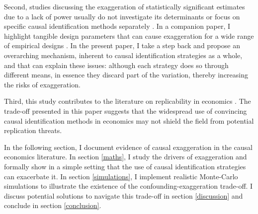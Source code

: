 			Second, studies discussing the exaggeration of statistically significant estimates due to a lack of power usually do not investigate its determinants or focus on specific causal identification methods separately \citep{ioannidis_power_2017, schellEvaluatingMethodsEstimate2018, ferraro_featureis_2020, black_simulated_2022, stommes_reliability_2021, arel-bundockQuantitativePoliticalScience2022}.  In a companion paper, I highlight tangible design parameters that can cause exaggeration for a wide range of empirical designs \citep{bagilet_accurate_2023}. In the present paper, I take a step back and propose an overarching mechanism, inherent to causal identification strategies as a whole, and that can explain these issues: although each strategy does so through different means, in essence they discard part of the variation, thereby increasing the risks of exaggeration. %
			
			Third, this study contributes to the literature on replicability in economics \citep{camerer_evaluating_2016, ioannidis_power_2017, christensen_transparency_2018, kasy_forking_2021}. The trade-off presented in this paper suggests that the widespread use of convincing causal identification methods in economics may not shield the field from potential replication threats.
			
			In the following section, I document evidence of causal exaggeration in the causal  economics literature. In section \ref{maths}, I study the drivers of exaggeration and formally show in a simple setting that the use of causal identification strategies can exacerbate it. In section  \ref{simulations}, I implement realistic Monte-Carlo simulations to illustrate the existence of the confounding-exaggeration trade-off. I discuss potential solutions to navigate this trade-off in section \ref{discussion} and conclude in section \ref{conclusion}.
	
	
		